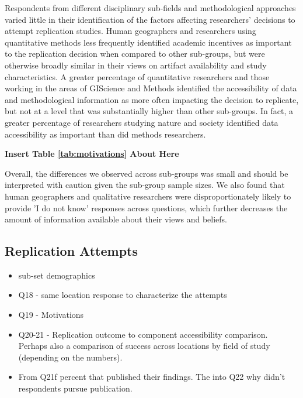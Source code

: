 \documentclass[]{interact}
\theoremstyle{plain}%
\theoremstyle{definition}
\theoremstyle{remark}
\begin{document}
Respondents from different disciplinary sub-fields and methodological approaches varied little in their identification of the factors affecting researchers' decisions to attempt replication studies. 
Human geographers and researchers using quantitative methods less frequently identified academic incentives as important to the replication decision when compared to other sub-groups, but were otherwise broadly similar in their views on artifact availability and study characteristics. 
A greater percentage of quantitative researchers and those working in the areas of GIScience and Methods identified the accessibility of data and methodological information as more often impacting the decision to replicate, but not at a level that was substantially higher than other sub-groups. 
In fact, a greater percentage of researchers studying nature and society identified data accessibility as important than did methods researchers.  

\begin{center}
\textbf{Insert Table \ref{tab:motivations} About Here}
\end{center}

Overall, the differences we observed across sub-groups was small and should be interpreted with caution given the sub-group sample sizes.
We also found that human geographers and qualitative researchers were disproportionately likely to provide 'I do not know' responses across questions,  
which further decreases the amount of information available about their views and beliefs. 



\subsection*{Replication Attempts}
\begin{itemize}
    \item sub-set demographics
    \item Q18 - same location response to characterize the attempts
    \item Q19 - Motivations
    \item Q20-21 - Replication outcome to component accessibility comparison. Perhaps also a comparison of success across locations by field of study (depending on the numbers).
    \item From Q21f percent that published their findings. The into Q22 why didn't respondents pursue publication.
\end{itemize}
\end{document}
